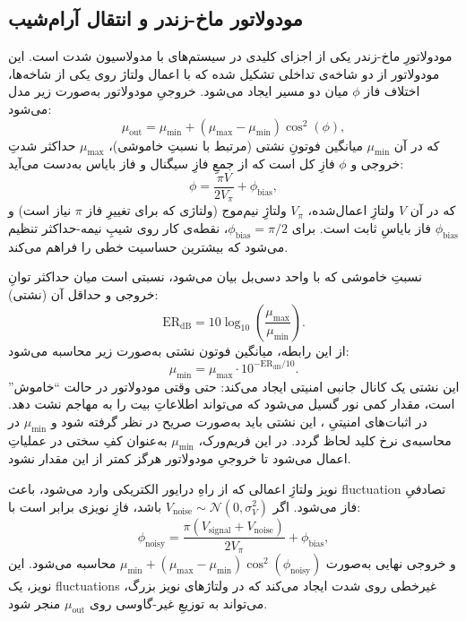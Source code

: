 \subsection{مودولاتور ماخ-زندر و انتقال آرام‌شیب}

مودولاتورِ ماخ-زندر  یکی از اجزای کلیدی در سیستم‌های  با مدولاسیون شدت است. این مودولاتور از دو شاخه‌ی تداخلی تشکیل شده که با اعمال ولتاژ روی یکی از شاخه‌ها، اختلاف فاز $\phi$ میان دو مسیر ایجاد می‌شود. خروجیِ مودولاتور به‌صورت زیر مدل می‌شود:
\begin{equation}
	\mu_{\text{out}} = \mu_{\min} + (\mu_{\max} - \mu_{\min}) \cos^2(\phi),
	\label{eq:mzm-transfer}
\end{equation}
که در آن $\mu_{\min}$ میانگین فوتونِ نشتی  (مرتبط با نسبتِ خاموشی)، $\mu_{\max}$ حداکثر شدتِ خروجی و $\phi$ فازِ کل است که از جمعِ فازِ سیگنال و فاز بایاس به‌دست می‌آید:
\begin{equation}
	\phi = \frac{\pi V}{2 V_\pi} + \phi_{\text{bias}},
	\label{eq:mzm-phase}
\end{equation}
که در آن $V$ ولتاژِ اعمال‌شده، $V_\pi$ ولتاژِ نیم‌موج  (ولتاژی که برای تغییرِ فاز $\pi$ نیاز است) و $\phi_{\text{bias}}$ فاز بایاسِ ثابت است. برای $\phi_{\text{bias}} = \pi/2$، نقطه‌ی کار روی شیبِ نیمه-حداکثر تنظیم می‌شود که بیشترین حساسیت خطی را فراهم می‌کند.

نسبتِ خاموشی  که با واحد دسی‌بل بیان می‌شود، نسبتی است میان حداکثر توانِ خروجی و حداقل آن (نشتی):
\begin{equation}
	\text{ER}_{\text{dB}} = 10 \log_{10}\left(\frac{\mu_{\max}}{\mu_{\min}}\right).
	\label{eq:extinction-ratio}
\end{equation}
از این رابطه، میانگین فوتون نشتی به‌صورت زیر محاسبه می‌شود:
\begin{equation}
	\mu_{\min} = \mu_{\max} \cdot 10^{-\text{ER}_{\text{dB}}/10}.
	\label{eq:mzm-leakage}
\end{equation}
این نشتی یک کانال جانبی امنیتی ایجاد می‌کند: حتی وقتی مودولاتور در حالت ``خاموش'' است، مقدار کمی نور گسیل می‌شود که می‌تواند اطلاعاتِ بیت را به مهاجم نشت دهد. در اثبات‌های امنیتیِ ، این نشتی باید به‌صورت صریح در نظر گرفته شود و $\mu_{\min}$ در محاسبه‌ی نرخ کلید لحاظ گردد. در این فریم‌ورک، $\mu_{\min}$ به‌عنوان کفِ سختی در عملیاتِ  اعمال می‌شود تا خروجیِ مودولاتور هرگز کمتر از این مقدار نشود.

نویز ولتاژِ اعمالی که از راهِ درایور الکتریکی وارد می‌شود، باعث fluctuation تصادفیِ فاز می‌شود. اگر $V_{\text{noise}} \sim \mathcal{N}(0, \sigma_V^2)$ باشد، فازِ نویزی برابر است با:
\begin{equation}
	\phi_{\text{noisy}} = \frac{\pi (V_{\text{signal}} + V_{\text{noise}})}{2 V_\pi} + \phi_{\text{bias}},
	\label{eq:mzm-noisy-phase}
\end{equation}
و خروجی نهایی به‌صورت $\mu_{\min} + (\mu_{\max} - \mu_{\min}) \cos^2(\phi_{\text{noisy}})$ محاسبه می‌شود. این نویز، یک fluctuations غیرخطی روی شدت ایجاد می‌کند که در ولتاژهای نویز بزرگ، می‌تواند به توزیعِ غیر-گاوسی روی $\mu_{\text{out}}$ منجر شود.

